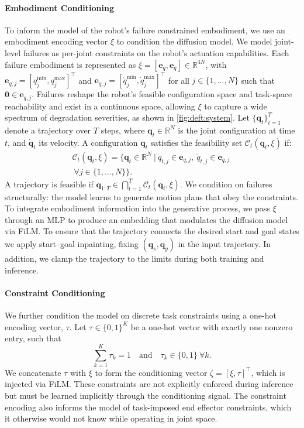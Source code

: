 \paragraph{Embodiment Conditioning}
To inform the model of the robot's failure constrained embodiment, we use an embodiment encoding vector $\xi$ to condition the diffusion model. We model joint-level failures as per-joint constraints on the robot's actuation capabilities. Each failure embodiment is represented as $\xi = [\mathbf{e}_q, \mathbf{e}_{\dot{q}}] \in \mathbb{R}^{4N}$, with $\mathbf{e}_{q,j} = [q_j^{\min}, q_j^{\max}]^\top$ and $\mathbf{e}_{\dot{q},j} = [\dot{q}_j^{\min}, \dot{q}_j^{\max}]^\top$ for all $j \in \{1,\dots,N\}$ such that $\mathbf{0} \in \mathbf{e}_{\dot{q},j}$.
Failures reshape the robot's feasible configuration space and task-space reachability and exist in a continuous space, allowing $\xi$ to capture a wide spectrum of degradation severities, as shown in \cref{fig:deft:system}. Let $\{\mathbf{q}_t\}_{t=1}^T$ denote a trajectory over $T$ steps, where $\mathbf{q}_t \in \mathbb{R}^N$ is the joint configuration at time $t$, and $\dot{\mathbf{q}}_t$ its velocity. A configuration $\mathbf{q}_t$ satisfies the feasibility set $\mathcal{C}_t(\mathbf{q}_t,\xi)$ if:
\begin{equation}
\begin{aligned}
  \mathcal{C}_t(\mathbf{q}_t,\xi)=\Big\{\mathbf{q}_t\in\mathbb{R}^N\ \Big|\
  q_{t,j}\in \mathbf{e}_{q,j},\ \dot{q}_{t,j}\in \mathbf{e}_{\dot{q},j}\ \\ \ \forall j\in\{1,\dots,N\}\Big\}.
\end{aligned}
\end{equation}
A trajectory is feasible if $\mathbf{q}_{1:T}\in\bigcap_{t=1}^T \mathcal{C}_t(\mathbf{q}_t,\xi)$. We condition on failures structurally: the model learns to generate motion plans that obey the constraints.
To integrate embodiment information into the generative process, we pass $\xi$ through an MLP to produce an embedding that modulates the diffusion model via FiLM. To ensure that the trajectory connects the desired start and goal states we apply start--goal inpainting, fixing $(\mathbf{q}_s,\mathbf{q}_g)$ in the input trajectory. In addition, we clamp the trajectory to the limits during both training and inference.

\paragraph{Constraint Conditioning}
We further condition the model on discrete task constraints using a one-hot encoding vector, $\tau$. Let $\tau \in \{0,1\}^K$ be a one-hot vector with exactly one nonzero entry, such that
\[
\sum_{k=1}^{K} \tau_k = 1
\quad \text{and} \quad
\tau_k \in \{0,1\} \ \forall k.
\]
We concatenate $\tau$ with $\xi$ to form the conditioning vector $\zeta = [\xi, \tau]^\top$, which is injected via FiLM.
These constraints are not explicitly enforced during inference but must be learned implicitly through the conditioning signal. The constraint encoding also informs the model of task-imposed end effector constraints, which it otherwise would not know while operating in joint space.

